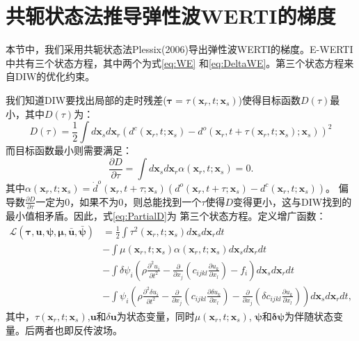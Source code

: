 \chapter{共轭状态法推导弹性波WERTI的梯度}
\label{cha:AdjointForEWERTI}
本节中，我们采用共轭状态法Plessix(2006)\cite{plessix2006}导出弹性波WERTI的梯度。E-WERTI中共有三个状态方程，其中两个为式\eqref{eq:WE}
和\eqref{eq:DeltaWE}。第三个状态方程来自DIW的优化约束。

我们知道DIW要找出局部的走时残差($\mathbf{\tau}=\tau(\mathbf{x}_r,t;\mathbf{x}_s)$)使得目标函数$D(\tau)$最小，其中$D(\tau)$为：
\begin{equation}
	D(\tau)=\frac{1}{2}\int
	d\mathbf{x}_sd\mathbf{x}_r(d^c(\mathbf{x}_r,t;\mathbf{x}_s)-
	d^o(\mathbf{x}_r,t+\tau(\mathbf{x}_r,t;\mathbf{x}_s);\mathbf{x}_s))^2
        \label{eq:Dl}
\end{equation}
而目标函数最小则需要满足：
\begin{equation}
	\frac{\partial D}{\partial \tau}=\int
	d\mathbf{x}_sd\mathbf{x}_r\alpha(\mathbf{x}_r,t;\mathbf{x}_s)=0.
        \label{eq:PartialD}
\end{equation}
其中$\alpha(\mathbf{x}_r,t;\mathbf{x}_s)=\dot{d}^o(\mathbf{x}_r,t+\tau;\mathbf{x}_s)(d^o(\mathbf{x}_r,t+\tau;\mathbf{x}_s)-
d^c(\mathbf{x}_r,t;\mathbf{x}_s))$。
偏导数$\frac{\partial D}{\partial
\tau}$一定为0，如果不为0，则总能找到一个$\tau$使得$D$变得更小，这与DIW找到的最小值相矛盾。因此，式\eqref{eq:PartialD}为
第三个状态方程。定义增广函数：
\begin{equation}
	\begin{split}
	\mathcal{L}(\mathbf{\tau},\mathbf{u},\mathbf{\psi},\mathbf{\mu},\bar{\mathbf{u}},\bar{\mathbf{\psi}})
	&=\frac{1}{2}\int \tau^2(\mathbf{x}_r,t;\mathbf{x}_s)d\mathbf{x}_sd\mathbf{x}_rdt\\
	&-\int
	\mu(\mathbf{x}_r,t;\mathbf{x}_s)\alpha(\mathbf{x}_r,t;\mathbf{x}_s)d\mathbf{x}_sd\mathbf{x}_rdt\\
	&-\int {\delta \psi_i}\left(\rho\frac{\partial^2 u_i }{\partial
	t^2}-\frac{\partial}{\partial x_j}(c_{ijkl}\frac{\partial u_k}{\partial x_l}) -
	f_i\right)d\mathbf{x}_sd\mathbf{x}_rdt\\
	&-\int \psi_i\left(\rho\frac{\partial^2
	\delta u_i }{\partial t^2}-\frac{\partial}{\partial x_j}(c_{ijkl}\frac{\partial
	\delta u_k}{\partial x_l})-\frac{\partial}{\partial x_j}(\delta
	c_{ijkl}\frac{\partial u_k}{\partial x_l})\right)d\mathbf{x}_sd\mathbf{x}_rdt,
	\end{split}
        \label{eq:Lagrangian}
\end{equation}
其中，$\tau(\mathbf{x}_r,t;\mathbf{x}_s)$,$\mathbf{u}$和$\delta \mathbf{u}$为状态变量，同时$\mu(\mathbf{x}_r,t;\mathbf{x}_s)$, 
$\boldsymbol{\psi}$和$\boldsymbol{\delta\psi}$为伴随状态变量。后两者也即反传波场。

